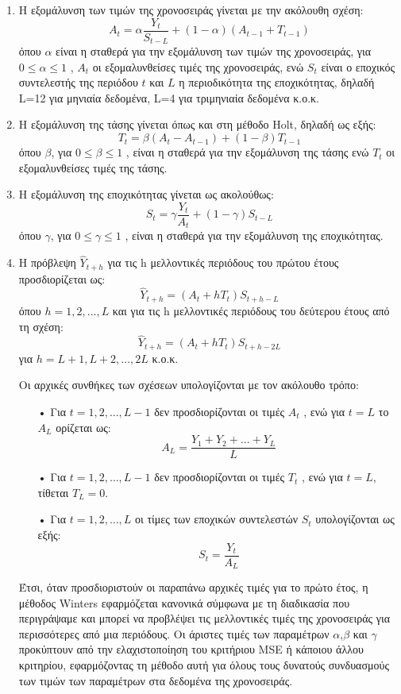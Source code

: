 \begin{enumerate}
\item Η εξομάλυνση των τιμών της χρονοσειράς γίνεται με την ακόλουθη σχέση:\\
$$ A_t=\alpha \frac{Y_t}{S_{t-L}}+\left(1-\alpha\right)\left(A_{t-1}+T_{t-1}\right) $$
όπου $\alpha$ είναι η σταθερά για την εξομάλυνση των τιμών της χρονοσειράς, για
$0 \leq \alpha \leq 1$ , $A_t$ οι εξομαλυνθείσες τιμές της χρονοσειράς, ενώ $S_t$ είναι ο εποχικός
συντελεστής της περιόδου $t$ και $L$ η περιοδικότητα της εποχικότητας, δηλαδή L=12
για μηνιαία δεδομένα, L=4 για τριμηνιαία δεδομένα κ.ο.κ.
\item Η εξομάλυνση της τάσης γίνεται όπως και στη μέθοδο Holt, δηλαδή ως εξής:\\
$$ T_t=\beta \left(A_t-A_{t-1}\right)+\left(1-\beta\right)T_{t-1} $$
όπου $\beta $, για $0 \leq \beta \leq 1$ , είναι η σταθερά για την εξομάλυνση της τάσης ενώ $Τ_t$ οι
εξομαλυνθείσες τιμές της τάσης.
\item Η εξομάλυνση της εποχικότητας γίνεται ως ακολούθως:\\
$$ S_t=\gamma \frac{Y_t}{A_t}+\left(1-\gamma\right)S_{t-L} $$
όπου $\gamma$, για $0 \leq \gamma \leq 1$ , είναι η σταθερά για την εξομάλυνση της εποχικότητας.
\item Η πρόβλεψη $ \widehat{Y}_{t+h}$ για τις h μελλοντικές περιόδους του πρώτου έτους προσδιορίζεται
ως:\\
$$ \widehat{Y}_{t+h}=\left(A_t+hT_t\right)S_{t+h-L}  $$
όπου $h=1,2,\ldots,L$
και για τις h μελλοντικές περιόδους του δεύτερου έτους από τη σχέση:\\
$$ \widehat{Y}_{t+h}=\left(A_t+hT_t\right)S_{t+h-2L} $$
για $h=L+1, L+2,\ldots,2L$ κ.ο.κ.


Οι αρχικές συνθήκες των σχέσεων υπολογίζονται με τον ακόλουθο τρόπο:\\
\begin{enumerate}
\item[•] Για $t = 1, 2, ..., L-1$ δεν προσδιορίζονται οι τιμές $A_t$ , ενώ για $t=L$ το $A_L$
ορίζεται ως:\\
$$ A_L=\frac{Y_1+Y_2+\ldots+Y_L}{L} $$
\item[•] Για $t = 1, 2,\ldots, L-1$ δεν προσδιορίζονται οι τιμές $T_t$ , ενώ για $t = L$, τίθεται
$T_L =0$.
\item[•] Για $t = 1, 2,\ldots,L$ οι τίμες των εποχικών συντελεστών $S_t$ υπολογίζονται ως
εξής:\\
$$ S_t=\frac{Y_t}{A_L} $$
\end{enumerate}
Έτσι, όταν προσδιοριστούν οι παραπάνω αρχικές τιμές για το πρώτο έτος, η
μέθοδος Winters εφαρμόζεται κανονικά σύμφωνα με τη διαδικασία που
περιγράψαμε και μπορεί να προβλέψει τις μελλοντικές τιμές της χρονοσειράς για
περισσότερες από μια περιόδους. Οι άριστες τιμές των παραμέτρων $\alpha$,$\beta$ και $\gamma$
προκύπτουν από την ελαχιστοποίηση του κριτήριου MSE ή κάποιου άλλου
κριτηρίου, εφαρμόζοντας τη μέθοδο αυτή για όλους τους δυνατούς συνδυασμούς
των τιμών των παραμέτρων στα δεδομένα της χρονοσειράς.



\end{enumerate}

